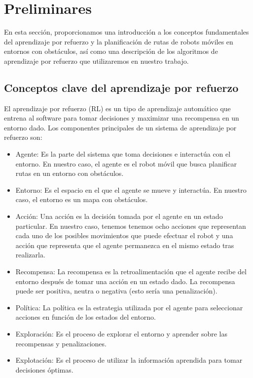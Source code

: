 \documentclass[conference,a4paper]{IEEEtran}
\begin{document}
\section{Preliminares}

En esta sección, proporcionamos una introducción a los conceptos fundamentales del aprendizaje por refuerzo y la planificación de rutas de robots 
móviles en entornos con obstáculos, así como una descripción de los algoritmos de aprendizaje por refuerzo que utilizaremos en nuestro trabajo.

\subsection{Conceptos clave del aprendizaje por refuerzo}

El aprendizaje por refuerzo (RL) es un tipo de aprendizaje automático que entrena al software para tomar decisiones y maximizar una recompensa en un entorno dado. 
Los componentes principales de un sistema de aprendizaje por refuerzo son:

\begin{itemize}
  \item Agente: Es la parte del sistema que toma decisiones e interactúa con el entorno. En nuestro caso, el agente es el robot móvil que busca planificar rutas en un entorno con obstáculos.
  \item Entorno: Es el espacio en el que el agente se mueve y interactúa. En nuestro caso, el entorno es un mapa con obstáculos.
  \item Acción: Una acción es la decisión tomada por el agente en un estado particular. En nuestro caso, tenemos tenemos ocho acciones que representan cada uno de los posibles movimientos que puede efectuar el robot y una 
    acción que representa que el agente permanezca en el mismo estado tras realizarla.
  \item Recompensa: La recompensa es la retroalimentación que el agente recibe del entorno después de tomar una acción en un estado dado. La recompensa puede ser positiva, neutra o negativa (esto sería una penalización).
  \item Política: La política es la estrategia utilizada por el agente para seleccionar acciones en función de los estados del entorno. 
  \item Exploración: Es el proceso de explorar el entorno y aprender sobre las recompensas y penalizaciones. 
  \item Explotación: Es el proceso de utilizar la información aprendida para tomar decisiones óptimas.
\end{itemize}
\end{document}
